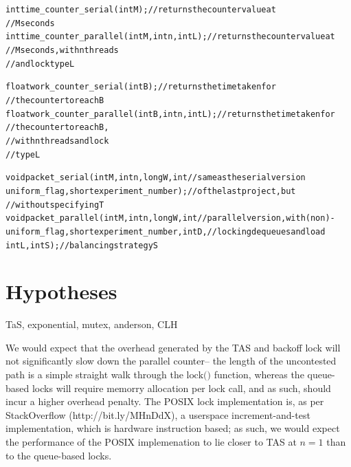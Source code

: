 \documentclass{article}
\newcommand{\cpart}[1]{\newblock{\LARGE {\\\\#1}}}
\newcommand{\code}[1]{\texttt{$\text{#1}$}}
\begin{document}
\begin{alltt}
int time_counter_serial(int M);                         // returns the counter value at
                                                        //   M seconds
int time_counter_parallel(int M, int n, int L);         // returns the counter value at
                                                        //   M seconds, with n threads
                                                        //   and lock type L

float work_counter_serial(int B);                       // returns the time taken for
                                                        //   the counter to reach B
float work_counter_parallel(int B, int n, int L);       // returns the time taken for
                                                        //   the counter to reach B,
                                                        //   with n threads and lock
                                                        //   type L

void packet_serial(int M, int n, long W, int            // same as the serial version
  uniform_flag, short experiment_number);               //   of the last project, but
                                                        //   without specifying T
void packet_parallel(int M, int n, long W, int          // parallel version, with (non)-
  uniform_flag, short experiment_number, int D,         //   locking dequeues and load
  int L, int S);                                        //   balancing strategy S
\end{alltt}

\section{Hypotheses}

TaS, exponential, mutex, anderson, CLH

\cpart{Idle Overhead}

We would expect that the overhead generated by the TAS and backoff lock will not significantly slow down the parallel counter-- the length of the uncontested path 
is a simple straight walk through the \code{lock()} function, whereas the queue-based locks will require memorry allocation per lock call, and as such, should incur 
a higher overhead penalty. The POSIX lock implementation is, as per StackOverflow (http://bit.ly/MHnDdX), a userspace increment-and-test implementation, which is 
hardware instruction based; as such, we would expect the performance of the POSIX implemenation to lie closer to TAS at $n = 1$ than to the queue-based locks.
\end{document}
